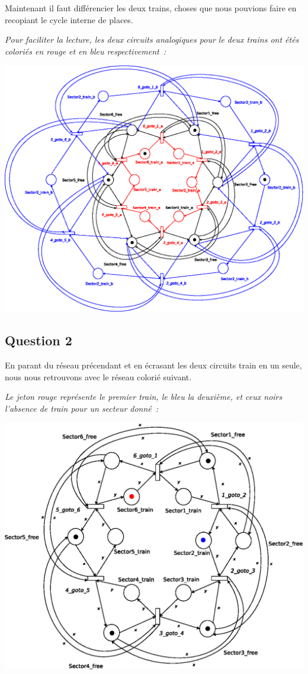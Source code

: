 Maintenant il faut différencier les deux trains, choses que nous pouvions faire
en recopiant le cycle interne de places. 

\emph{Pour faciliter la lecture, les deux circuits analogiques pour le deux trains ont
étés coloriés en rouge et en bleu respectivement~:}

\begin{center}
\includegraphics[height = 0.6\paperwidth]{exo8_uncoloured.eps}
\end{center}


\subsection*{Question 2}

En parant du réseau précendant et en écrasant les deux circuits \og{}train\fg{}
en un seule, nous nous retrouvons avec le réseau colorié suivant.

\emph{Le jeton rouge représente le premier train, le bleu la deuxième, et ceux
noirs l'absence de train pour un secteur donné~:}

\begin{center}
\includegraphics[height = 0.5\paperwidth]{exo8_coloured.eps}
\end{center}

